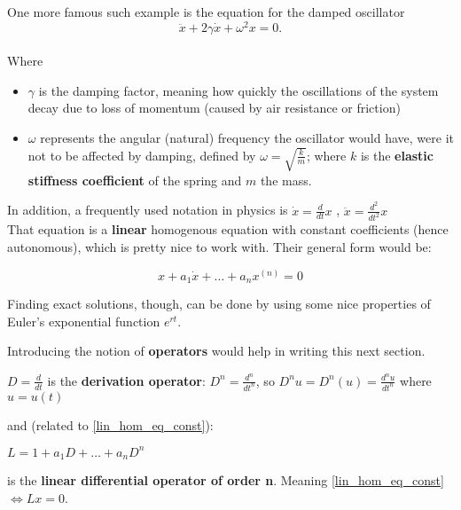 One more famous such example is the equation for the damped oscillator
\begin{equation}\label{eq:3.2.4}
    \ddot{x} + 2\gamma\dot{x} + \omega^2x = 0.
\end{equation} \\
Where \\
\begin{itemize}
    \item $\gamma$ is the damping factor, meaning how quickly the oscillations of the system decay due to loss of momentum (caused by air resistance or friction) \\

    \item  $\omega$ represents the angular (natural) frequency the oscillator would have, were it not to be affected by damping, defined by
          $\omega = \sqrt{\frac{k}{m}}$; where $k$ is the \textbf{elastic stiffness coefficient} of the spring and $m$ the mass. \\
\end{itemize}

In addition, a frequently used notation in physics is
$\dot{x} = \frac{d}{dt}x$ , $\ddot{x}=\frac{d^2}{dt^2}x$
\\

That equation is a \textbf{linear} homogenous equation with constant coefficients (hence autonomous), which is pretty nice to work with. Their general form would be:

\begin{equation}\label{lin_hom_eq_const}
    x + a_1\dot{x}+ \dots +a_{n} x^{(n)} = 0
\end{equation}

Finding exact solutions, though, can be done by using some nice properties of Euler's exponential function $e^{rt}$.

Introducing the notion of \textbf{operators} would help in writing this next section.

\begin{definition}
    $D = \frac{d}{dt}$ is the \textbf{derivation operator}:
    $D^n = \frac{d^n}{dt^n}$, so $D^nu = D^n(u) =\frac{d^nu}{dt^n}$ where $u=u(t)$
    \par
    \hspace{20pt} and (related to \ref{lin_hom_eq_const}): \par
    \hspace{20pt} $L = 1 + a_1D + \dots + a_nD^n$ \par
    \hspace{20pt} is the \textbf{linear differential operator of order n}. Meaning \ref{lin_hom_eq_const} $\iff Lx=0$.
\end{definition}


